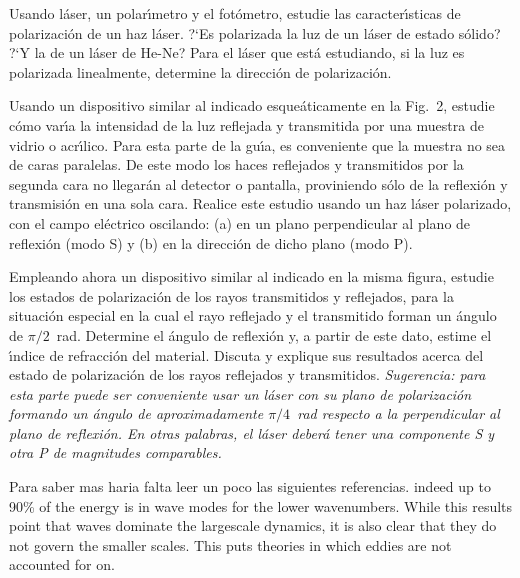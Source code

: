 \documentclass[epj]{svjour}
\begin{document}
Usando l\'aser, un polar\'\i metro y el fot\'ometro, estudie las 
caracter\'\i sticas de polarizaci\'on de un haz l\'aser. ?`Es polarizada la
luz de un l\'aser de estado s\'olido? ?`Y la de un l\'aser de He-Ne? Para el
l\'aser que est\'a estudiando, si la luz es polarizada linealmente, determine
la direcci\'on de polarizaci\'on.

Usando un dispositivo similar al indicado esque\'aticamente en la Fig.~2, 
estudie c\'omo var\'\i a la intensidad de la luz reflejada y transmitida por 
una muestra de vidrio o acr\'\i lico. Para esta parte de la gu\'\i a, es 
conveniente que la muestra no sea de caras paralelas. De este modo los haces
reflejados y transmitidos por la segunda cara no llegar\'an al detector o
pantalla, proviniendo s\'olo de la reflexi\'on y transmisi\'on en una sola 
cara. Realice este estudio usando un haz l\'aser polarizado, con el campo
el\'ectrico oscilando: (a) en un plano perpendicular al plano de reflexi\'on 
(modo S) y (b) en la direcci\'on de dicho plano (modo P).

Empleando ahora un dispositivo similar al indicado en la misma figura, estudie
los estados de polarizaci\'on de los rayos transmitidos y reflejados, para la
situaci\'on especial en la cual el rayo reflejado y el transmitido forman 
un \'angulo de $\pi/2$~rad. Determine el \'angulo de reflexi\'on y, a 
partir de este dato, estime el \'\i ndice de refracci\'on del material. 
Discuta y explique sus resultados acerca del estado de polarizaci\'on de los
rayos reflejados y transmitidos. {\it Sugerencia: para esta parte puede 
ser conveniente usar un l\'aser con su plano de polarizaci\'on formando un
\'angulo de aproximadamente $\pi/4$~rad respecto a la perpendicular al plano
de reflexi\'on. En otras palabras, el l\'aser deber\'a tener una componente
S y otra P de magnitudes comparables. }

\begin{sabermas}
Para saber mas haria falta leer un poco las siguientes referencias.
indeed up to 90\% of the energy is in wave modes for the lower
wavenumbers. While this results point that waves dominate the largescale
dynamics, it is also clear that they do not govern the smaller scales.
This puts theories in which eddies are not accounted for on.
\end{sabermas}

% 
% 
\end{document}
